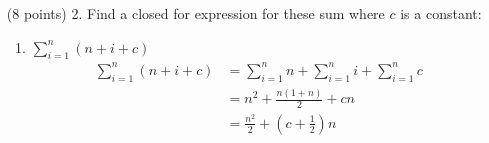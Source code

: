 \documentclass[paper=a4, fontsize=11pt]{scrartcl}
\newtheorem{theorem}{Theorem}
\numberwithin{equation}{section}		%
\numberwithin{figure}{section}			%
\numberwithin{table}{section}				%
\begin{document}
\begin{enumerate}
\begin{proof}
		$\log(n^2 + 1) \in \Theta(\log(n))$.
	\end{proof}
\begin{theorem}
$2^{n + 2} + 2 \in \Theta(2^n)$
\end{theorem}
	\begin{proof}
		We can use the limit test and L'Hopital's rule. 
		
		We will calculate the limit of $\frac{2^{n + 2} + 2}{2^n}$. 
		\begin{align*}
			\lim_{n\rightarrow\infty} \frac{2^{n + 2} + 2}{2^n} &= \lim_{n\rightarrow\infty} \frac{2^{n+2}}{2^n} + \lim_{n\rightarrow\infty} \frac{2}{2^n} \\
			&= 2^2\lim_{n\rightarrow\infty} 1 + 2 \lim_{n\rightarrow\infty} \frac{1}{2^n} \\
			&= 4 + 0 = 4
		\end{align*}
		Since the limite is non-zero constant we can conclude by the limit test:
		
		$2^{n + 2} + 2 \in \Theta(2^n)$.
	\end{proof}


\item [(8 points) 2.] Find a closed for expression for these sum where $c$ is a constant:
\begin{enumerate}
\item 
$\displaystyle\sum_{i=1}^{n}(n+i+c)$
\begin{align*}
	\sum_{i=1}^{n}(n+i+c) &= \sum_{i=1}^{n}n + \sum_{i=1}^{n}i + \sum_{i=1}^{n}c \\
	&= n^2 + \frac{n(1+n)}{2} + cn \\
	&= \frac{n^2}{2} + (c+\frac{1}{2})n
\end{align*}





\end{enumerate}
\end{enumerate}
\end{document}
